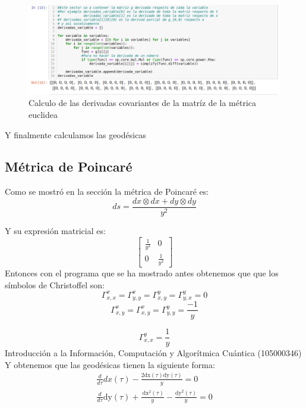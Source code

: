\documentclass[pdftex,11pt,a4paper]{book}
\begin{document}
\begin{figure}[!ht]
    \centering
    \includegraphics[scale=0.33]{euclidea_covariante.png}
    \caption{Calculo de las derivadas covariantes de la matríz de la métrica euclidea}
    \label{fig:euclidea_covariante}
\end{figure}

Y finalmente calculamos las geodésicas 

\newpage






\subsection{Métrica de Poincaré}
Como se mostró en la sección  la métrica de Poincaré es: 
\begin{equation}
    ds= \frac{dx \otimes dx + dy \otimes dy}{y^2}
\end{equation}



Y su expresión matricial es: 
\begin{equation}
    \left[\begin{matrix}\frac{1}{y^{2}} & 0\\0 & \frac{1}{y^{2}}\end{matrix}\right]
\end{equation}
Entonces con el programa que se ha mostrado antes obtenemos que que los símbolos de Christoffel son: 
\begin{equation}
    \Gamma^x_{x,x}= \Gamma^x_{y,y} = \Gamma^y_{x,y} = \Gamma^y_{y,x} = 0
\end{equation}
\begin{equation}
    \Gamma^x_{x,y} = \Gamma^x_{x,y}  = \Gamma^y_{y,y}=  \frac{-1}{y} 
\end{equation}

\begin{equation}
    \Gamma^y_{x,x} = \frac{1}{y}
\end{equation}
Introducción a la Información, Computación y Algorítmica Cuántica (105000346)
Y obtenemos que las geodésicas tienen la siguiente forma: 
\begin{equation}
\begin{array}{l}
\frac{d}{d \tau} d x(\tau)-\frac{2 \mathrm{dx}(\tau) \mathrm{dy}(\tau)}{y}=0 \\
\frac{d}{d \tau} \mathrm{dy}(\tau)+\frac{\mathrm{~d} \mathrm{x}^{2}(\tau)}{y}-\frac{ \mathrm{dy}^{2}(\tau)}{y}=0
\end{array}
\end{equation}
\end{document}
